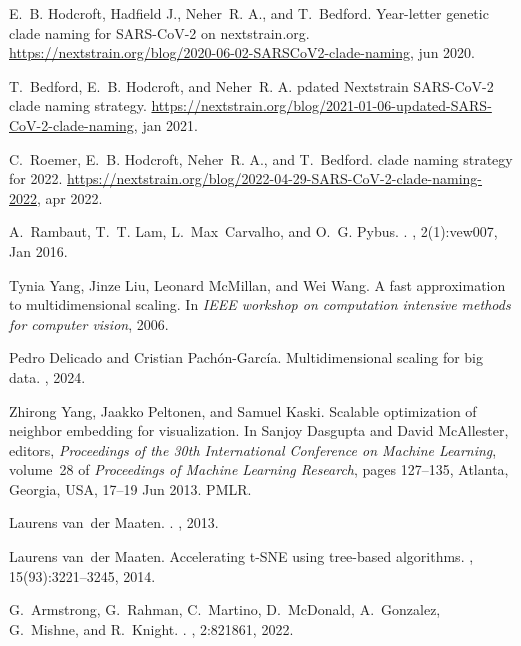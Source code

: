 \documentclass[webpdf,contemporary,large,single]{oup-authoring-template}%
\theoremstyle{thmstyleone}%
\theoremstyle{thmstyletwo}%
\theoremstyle{thmstylethree}%
\begin{document}
\begin{thebibliography}{10}
E.~B. Hodcroft, Hadfield J., Neher~R. A., and T.~Bedford.
\newblock Year-letter genetic clade naming for {SARS-CoV-2} on nextstrain.org.
\newblock \url{https://nextstrain.org/blog/2020-06-02-SARSCoV2-clade-naming},
  jun 2020.

T.~Bedford, E.~B. Hodcroft, and Neher~R. A.
pdated {N}extstrain {SARS-CoV-2} clade naming strategy.
\newblock
  \url{https://nextstrain.org/blog/2021-01-06-updated-SARS-CoV-2-clade-naming},
  jan 2021.

C.~Roemer, E.~B. Hodcroft, Neher~R. A., and T.~Bedford.
 clade naming strategy for 2022.
\newblock
  \url{https://nextstrain.org/blog/2022-04-29-SARS-CoV-2-clade-naming-2022},
  apr 2022.

A.~Rambaut, T.~T. Lam, L.~Max~Carvalho, and O.~G. Pybus.
.
, 2(1):vew007, Jan 2016.

Tynia Yang, Jinze Liu, Leonard McMillan, and Wei Wang.
\newblock A fast approximation to multidimensional scaling.
\newblock In {\em IEEE workshop on computation intensive methods for computer
  vision}, 2006.

Pedro Delicado and Cristian Pach\'{o}n-Garc\'{i}a.
\newblock Multidimensional scaling for big data.
, 2024.

Zhirong Yang, Jaakko Peltonen, and Samuel Kaski.
\newblock Scalable optimization of neighbor embedding for visualization.
\newblock In Sanjoy Dasgupta and David McAllester, editors, {\em Proceedings of
  the 30th International Conference on Machine Learning}, volume~28 of {\em
  Proceedings of Machine Learning Research}, pages 127--135, Atlanta, Georgia,
  USA, 17--19 Jun 2013. PMLR.

Laurens van~der Maaten.
.
, 2013.

Laurens van~der Maaten.
\newblock Accelerating {t-SNE} using tree-based algorithms.
, 15(93):3221--3245, 2014.

G.~Armstrong, G.~Rahman, C.~Martino, D.~McDonald, A.~Gonzalez, G.~Mishne, and
  R.~Knight.
.
, 2:821861, 2022.


\end{thebibliography}
\end{document}
